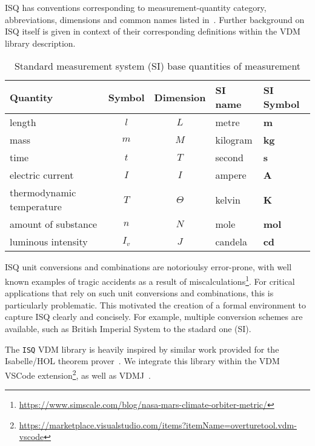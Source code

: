 \documentclass[runningheads,a4paper]{llncs}
\begin{document}
ISQ has conventions corresponding to measurement-quantity category, abbreviations, dimensions and common names listed in~. Further background on ISQ itself is given in context of their corresponding definitions within the VDM library description.  
%
\begin{table}[htbp]
    \centering
    \begin{tabular}{lccll}
        \toprule 
        \textbf{Quantity}         & \textbf{Symbol}& \textbf{Dimension}  & \textbf{SI name} & \textbf{SI Symbol}  \\ \hline 
        length                    & \(l\)          & \(L\)        &  metre	   & \textbf{m}   \\ \midrule
        mass                      & \(m\)	       & \(M\)	      &  kilogram  & \textbf{kg}  \\ \midrule
        time                      & \(t\)          & \(T\)        &  second    & \textbf{s}   \\ \midrule 
        electric current          & \(I\)	       & \(I\)	      &  ampere    & \textbf{A}	  \\ \midrule 
        thermodynamic temperature & \(T\)	       & \(\Theta\)   &  kelvin    & \textbf{K}	  \\ \midrule
        amount of substance       & \(n\)          & \(N\)        &  mole      & \textbf{mol} \\ \midrule
        luminous intensity        & \(I_v\)	       & \(J\)	      &  candela   & \textbf{cd}  \\
        \bottomrule
    \end{tabular}
    \caption{Standard measurement system (SI) base quantities of measurement}\label{tbl:SI}
\end{table} 

ISQ unit conversions and combinations are notorioulsy error-prone, with well known examples of tragic accidents as a result of miscalculations\footnote{\url{https://www.simscale.com/blog/nasa-mars-climate-orbiter-metric/}}. For critical applications that rely on such unit conversions and combinations, this is particularly problematic. This motivated the creation of a formal environment to capture ISQ clearly and concisely. For example, multiple conversion schemes are available, such as British Imperial System to the stadard one (SI).       

The \texttt{ISQ} VDM library is heavily inspired by similar work provided for the Isabelle/HOL theorem prover~\cite{Physical_Quantities-AFP}. We integrate this library within the VDM VSCode extension\footnote{\url{https://marketplace.visualstudio.com/items?itemName=overturetool.vdm-vscode}}, as well as VDMJ~\cite{Battle09}.
\end{document}
